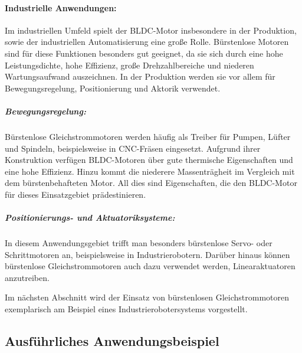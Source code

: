 \paragraph{Industrielle Anwendungen:} Im industriellen Umfeld spielt der BLDC-Motor insbesondere in der Produktion, sowie der industriellen Automatisierung eine große Rolle. Bürstenlose Motoren sind für diese Funktionen besonders gut geeignet, da sie sich durch eine hohe Leistungsdichte, hohe Effizienz, große Drehzahlbereiche und niederen Wartungsaufwand auszeichnen. In der Produktion werden sie vor allem für Bewegungsregelung, Positionierung und Aktorik verwendet.

\subparagraph{Bewegungsregelung:} Bürstenlose Gleichstrommotoren werden häufig als Treiber für Pumpen, Lüfter und Spindeln, beispielsweise in CNC-Fräsen eingesetzt. Aufgrund ihrer Konstruktion verfügen BLDC-Motoren über gute thermische Eigenschaften und eine hohe Effizienz. Hinzu kommt die niederere Massenträgheit im Vergleich mit dem bürstenbehafteten Motor. All dies sind Eigenschaften, die den BLDC-Motor für dieses Einsatzgebiet prädestinieren.

\subparagraph{Positionierungs- und Aktuatoriksysteme:} In diesem Anwendungsgebiet trifft man besonders bürstenlose Servo- oder Schrittmotoren an, beispielsweise in Industrierobotern. Darüber hinaus können bürstenlose Gleichstrommotoren auch dazu verwendet werden, Linearaktuatoren anzutreiben.

Im nächsten Abschnitt wird der Einsatz von bürstenlosen Gleichstrommotoren exemplarisch am Beispiel eines Industrierobotersystems vorgestellt.

\subsection{Ausführliches Anwendungsbeispiel}



